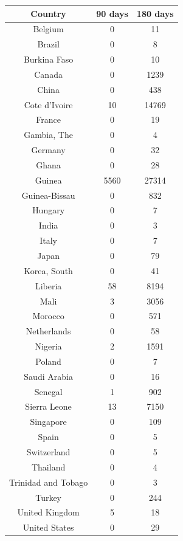 \documentclass[10pt, journal,onecolumn]{IEEEtran}
\begin{document}
    \begin{tabular}{ |c|c|c| }
      \hline
      \textbf{Country} & \textbf{90 days} & \textbf{180 days} \\
      \hline
      Belgium	& 0 & 11 \\
      Brazil	& 0 & 8 \\
      Burkina Faso	& 0 & 10 \\
      Canada	& 0 & 1239 \\
      China	& 0 & 438 \\
      Cote d'Ivoire	& 10 & 14769 \\
      France	& 0 & 19 \\
      Gambia, The	& 0 & 4 \\
      Germany	& 0 & 32 \\
      Ghana	& 0 & 28 \\
      Guinea	& 5560 & 27314 \\
      Guinea-Bissau	& 0 & 832 \\
      Hungary	& 0 & 7 \\
      India	& 0 & 3 \\
      Italy	& 0 & 7 \\
      Japan	& 0 & 79 \\
      Korea, South	& 0 & 41 \\
      Liberia	& 58 & 8194 \\
      Mali	& 3 & 3056 \\
      Morocco	& 0 & 571 \\
      Netherlands	& 0 & 58 \\
      Nigeria	& 2 & 1591 \\
      Poland	& 0 & 7 \\
      Saudi Arabia	& 0 & 16 \\
      Senegal	& 1 & 902 \\
      Sierra Leone	& 13 & 7150 \\
      Singapore	& 0 & 109 \\
      Spain	& 0 & 5 \\
      Switzerland	& 0 & 5 \\
      Thailand	& 0 & 4 \\
      Trinidad and Tobago	& 0 & 3 \\
      Turkey	& 0 & 244 \\
      United Kingdom	& 5 & 18 \\
      United States	& 0 & 29 \\
      \hline
    \end{tabular}
\end{document}
